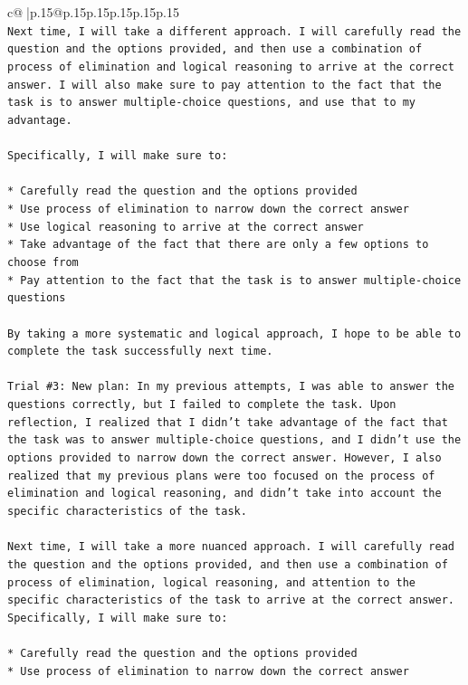 \documentclass{article}
\begin{document}
{\begin{supertabular}{c@{$\;$}|p{.15\linewidth}@{}p{.15\linewidth}p{.15\linewidth}p{.15\linewidth}p{.15\linewidth}p{.15\linewidth}}
{{{\\ 
\texttt{Next time, I will take a different approach. I will carefully read the question and the options provided, and then use a combination of process of elimination and logical reasoning to arrive at the correct answer. I will also make sure to pay attention to the fact that the task is to answer multiple{-}choice questions, and use that to my advantage.} \\
\\ 
\texttt{Specifically, I will make sure to:} \\
\\ 
\texttt{* Carefully read the question and the options provided} \\
\texttt{* Use process of elimination to narrow down the correct answer} \\
\texttt{* Use logical reasoning to arrive at the correct answer} \\
\texttt{* Take advantage of the fact that there are only a few options to choose from} \\
\texttt{* Pay attention to the fact that the task is to answer multiple{-}choice questions} \\
\\ 
\texttt{By taking a more systematic and logical approach, I hope to be able to complete the task successfully next time.} \\
\\ 
\texttt{Trial \#3: New plan: In my previous attempts, I was able to answer the questions correctly, but I failed to complete the task. Upon reflection, I realized that I didn't take advantage of the fact that the task was to answer multiple{-}choice questions, and I didn't use the options provided to narrow down the correct answer. However, I also realized that my previous plans were too focused on the process of elimination and logical reasoning, and didn't take into account the specific characteristics of the task.} \\
\\ 
\texttt{Next time, I will take a more nuanced approach. I will carefully read the question and the options provided, and then use a combination of process of elimination, logical reasoning, and attention to the specific characteristics of the task to arrive at the correct answer. Specifically, I will make sure to:} \\
\\ 
\texttt{* Carefully read the question and the options provided} \\
\texttt{* Use process of elimination to narrow down the correct answer} \\
}}}
\end{supertabular}}
\end{document}
